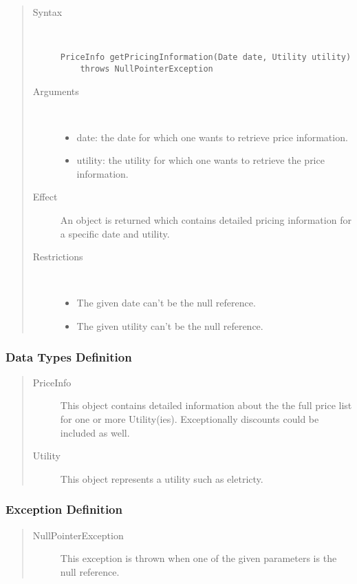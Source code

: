 \begin{quote}
	\begin{description}
		\item[Syntax] \
		\begin{verbatim}
PriceInfo getPricingInformation(Date date, Utility utility)
    throws NullPointerException
		\end{verbatim}
		\item[Arguments] \
		\begin{itemize}
		  \item date: the date for which one wants to retrieve price information.
		  \item utility: the utility for which one wants to retrieve the price
		  information.
		\end{itemize}
		\item[Effect] An object is returned which contains detailed pricing
		information for a specific date and utility.
		\item[Restrictions] \
		\begin{itemize}
		  \item The given date can't be the null reference.
		  \item The given utility can't be the null reference.
		\end{itemize}
	\end{description} 
\end{quote}

\subsubsection{Data Types Definition}

\begin{quote}
	\begin{description}
		\item[PriceInfo] This object contains detailed information about the
		the full price list for one or more Utility(ies). Exceptionally discounts
		could be included as well.
		\item[Utility] This object represents a utility such as eletricty.
	\end{description} 
\end{quote}

\subsubsection{Exception Definition} 

\begin{quote}
	\begin{description}
		\item[NullPointerException] This exception is thrown when one of the given
		parameters is the null reference.
	\end{description} 
\end{quote}
